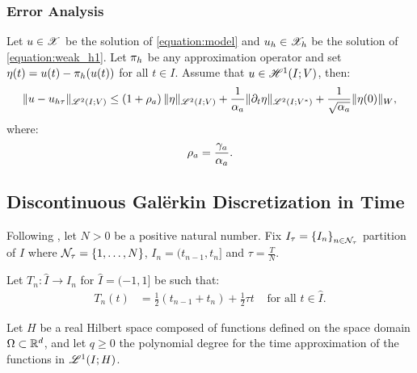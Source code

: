 \subsubsection{Error Analysis}




\begin{theorem} \label{theorem:estimate_h}
    Let $u \in \mathscr{X}$ be the solution of \cref{equation:model} and $u_h \in \mathscr{X}_h$ be the solution of \cref{equation:weak_h1}. Let $\pi_h$ be any approximation operator and set $\eta(t) = u(t) - \pi_h(u(t))$ for all $t \in I$. Assume that $u \in \mathscr{H}^{1}(I; V)$, then:
    \begin{align}
        \lVert u - u_{h \tau} \rVert_{\mathscr{L}^{2}(I; V)} \leq \left( 1 + \rho_{a} \right) \lVert \eta \rVert_{\mathscr{L}^{2}(I; V)} + \frac{1}{\alpha_{a}} \lVert \partial_t \eta \rVert_{\mathscr{L}^{2}(I; V^*)} + \frac{1}{\sqrt{\alpha_{a}}} \lVert \eta(0) \rVert_W,
    \end{align}
    where:
    \begin{align}
        \rho_{a} = \frac{\gamma_{a}}{\alpha_{a}}.
    \end{align}
\end{theorem}

\newpage
\subsection{Discontinuous Galërkin Discretization in Time} \label{subsection:time_dg}

Following \cite[p.~177]{Ern2021}, let $N > 0$ be a positive natural number. Fix $I_{\tau} = \left\{ I_n \right\}_{n \in \mathcal{N}_{\tau}}$ partition of $I$ where $\mathcal{N}_{\tau} = \left\{ 1, \dots, N \right\}$, $I_n = (t_{n - 1}, t_n]$ and $\tau = \frac{T}{N}$.

\begin{definition}[Mapping]
    Let $T_n \colon \hat{I} \rightarrow I_n$ for $\hat{I} = (-1, 1]$ be such that:
    \begin{align}
        T_n(t) &= \frac{1}{2}(t_{n - 1} + t_n) + \frac{1}{2} \tau t &\text{ for all } t \in \hat{I}.
    \end{align}
\end{definition}

Let $H$ be a real Hilbert space composed of functions defined on the space domain $\Omega \subset \mathbb{R}^{d}$, and let $q \geq 0$ the polynomial degree for the time approximation of the functions in $\mathscr{L}^{1}(I; H)$.

